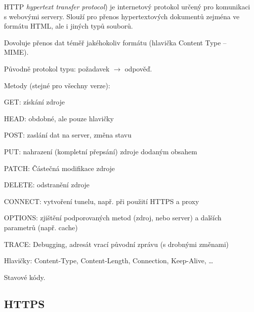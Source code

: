 \begin{compactitem}
    \item HTTP \textit{hypertext transfer protocol}) je internetový protokol určený pro komunikaci s webovými servery. Slouží pro přenos hypertextových dokumentů zejména ve formátu HTML, ale i jiných typů souborů. \begin{compactitem}
        \item Dovoluje přenos dat téměř jakéhokoliv formátu (hlavička Content Type -- MIME).
    \end{compactitem}

    \item Původně protokol typu: požadavek $\rightarrow$ odpověď.

    \item Metody (stejné pro všechny verze): \begin{compactitem}
        \item GET: získání zdroje
        \item HEAD: obdobné, ale pouze hlavičky
        \item POST: zaslání dat na server, změna stavu
        \item PUT: nahrazení (kompletní přepsání) zdroje dodaným obsahem
        \item PATCH: Částečná modifikace zdroje
        \item DELETE: odstranění zdroje
        \item CONNECT: vytvoření tunelu, např. při použití HTTPS a proxy
        \item OPTIONS: zjištění podporovaných metod (zdroj, nebo server) a dalších parametrů (např. cache)
        \item TRACE: Debugging, adresát vrací původní zprávu (s drobnými změnami)
    \end{compactitem}

    \item Hlavičky: Content-Type, Content-Length, Connection, Keep-Alive, \dots
    \item Stavové kódy.
\end{compactitem}

\subsection{HTTPS}

